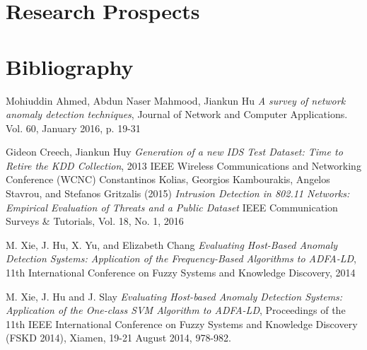 \documentclass{beamer}
\begin{document}
\section{Research Prospects}

\section{Bibliography}
\frame
{
\scriptsize

\begin{thebibliography}{5}

 Mohiuddin Ahmed, Abdun Naser Mahmood, Jiankun Hu \emph{A survey of network anomaly detection techniques}, Journal of Network and Computer Applications. Vol. 60, January 2016, p. 19-31

 Gideon Creech, Jiankun Huy \emph{Generation of a new IDS Test Dataset: Time to Retire the KDD Collection}, 
2013 IEEE Wireless Communications and Networking Conference (WCNC)
 Constantinos Kolias, Georgios Kambourakis, Angelos Stavrou, and Stefanos Gritzalis (2015) \emph{Intrusion Detection in 802.11 Networks: Empirical Evaluation of Threats and a Public Dataset} IEEE Communication Surveys \& Tutorials, Vol. 18, No. 1, 2016

 M. Xie, J. Hu, X. Yu, and Elizabeth Chang \emph{Evaluating Host-Based Anomaly Detection Systems: Application of the Frequency-Based Algorithms to ADFA-LD}, 11th International Conference on Fuzzy Systems and Knowledge Discovery, 2014

 M. Xie, J. Hu and J. Slay \emph{Evaluating Host-based Anomaly Detection Systems:
Application of the One-class SVM Algorithm to ADFA-LD}, Proceedings of the 11th IEEE International Conference on Fuzzy Systems and Knowledge Discovery (FSKD 2014), Xiamen, 19-21 August 2014, 978-982. 



\end{thebibliography}

}
\end{document}
